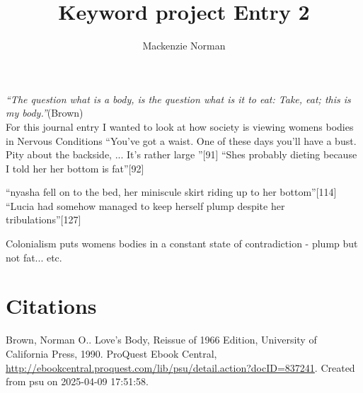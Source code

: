 \documentclass{article}
\title{Keyword project Entry 2}
\author{Mackenzie Norman}
\date{}
\begin{document}
\maketitle
\textit{``The question what is a body, is the question what is it to eat: Take, eat; this is my body.''}(Brown) \\


For this journal entry I wanted to look at how society is viewing womens bodies in Nervous Conditions
``You've got a waist. One of these days you'll have a bust. Pity about the backside, ... It's rather large  ''[91]
``Shes probably dieting because I told her her bottom is fat''[92]

``nyasha fell on to the bed, her miniscule skirt riding up to her bottom''[114]
``Lucia had somehow managed to keep herself plump despite her tribulations''[127]

Colonialism puts womens bodies in a constant state of contradiction  - plump but not fat... etc.
\paragraph{}

\section{Citations}

Brown, Norman O.. Love's Body, Reissue of 1966 Edition, University of California Press, 1990. ProQuest Ebook Central, \url{http://ebookcentral.proquest.com/lib/psu/detail.action?docID=837241}.
Created from psu on 2025-04-09 17:51:58. 
\end{document}
